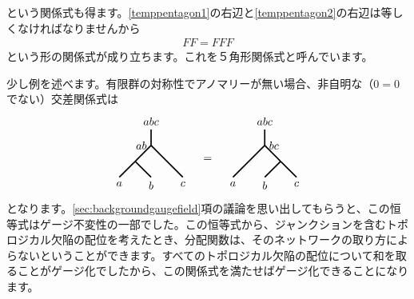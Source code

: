 \documentclass[report,paper=a4, fontsize=12pt, line_length=16cm, number_of_lines=33,dvipdfmx]{jlreq}
\numberwithin{equation}{chapter}
\begin{document}
という関係式も得ます。\eqref{temppentagon1}の右辺と\eqref{temppentagon2}の右辺は等しくなければなりませんから
\begin{align}
  FF = FFF
\end{align}
という形の関係式が成り立ちます。これを５角形関係式と呼んでいます。

少し例を述べます。有限群の対称性でアノマリーが無い場合、非自明な（$0=0$でない）交差関係式は
\begin{align}
  \begin{tikzpicture}[baseline=0]
      \draw[very thick](0,0)--(0.5,0.5) node [left]{$ab$};
      \draw[very thick](0,0)--(-0.5,-0.5) node[below]{$a$};
      \draw[very thick](0,0)--(0.5,-0.5) node[below]{$b$};
      \draw[very thick](0.5,0.5)--(1.5,-0.5) node[below]{$c$};
      \draw[very thick](0.5,0.5)--(0.5,1) node[above]{$abc$};
  \end{tikzpicture}
  \quad = \quad
  \begin{tikzpicture}[baseline=0]
      \draw[very thick](1,0)--(0.5,0.5) node [right]{$bc$};
      \draw[very thick](0.5,0.5)--(-0.5,-0.5) node[below]{$a$};
      \draw[very thick](1,0)--(0.5,-0.5) node[below]{$b$};
      \draw[very thick](1,0)--(1.5,-0.5) node[below]{$c$};
      \draw[very thick](0.5,0.5)--(0.5,1) node[above]{$abc$};
  \end{tikzpicture}
\end{align}
となります。\ref{sec:backgroundgaugefield}項の議論を思い出してもらうと、この恒等式はゲージ不変性の一部でした。この恒等式から、ジャンクションを含むトポロジカル欠陥の配位を考えたとき、分配関数は、そのネットワークの取り方によらないということができます。すべてのトポロジカル欠陥の配位について和を取ることがゲージ化でしたから、この関係式を満たせばゲージ化できることになります。
\end{document}

